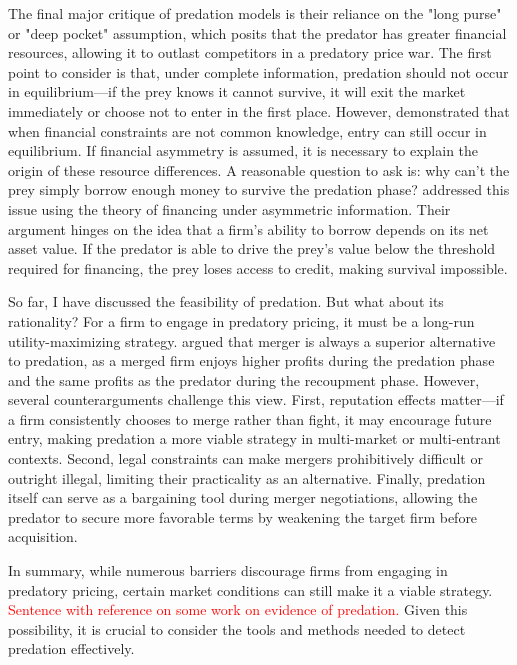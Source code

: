 \documentclass[12pt,oneside]{article}
\theoremstyle{definition}
\theoremstyle{remark}
\begin{document}
The final major critique of predation models is their reliance on the "long purse" or "deep pocket" assumption, which posits that the predator has greater financial resources, allowing it to outlast competitors in a predatory price war. The first point to consider is that, under complete information, predation should not occur in equilibrium—if the prey knows it cannot survive, it will exit the market immediately or choose not to enter in the first place. However, \cite{Benoit1984} demonstrated that when financial constraints are not common knowledge, entry can still occur in equilibrium. If financial asymmetry is assumed, it is necessary to explain the origin of these resource differences. A reasonable question to ask is: why can’t the prey simply borrow enough money to survive the predation phase? \citet{Fudenberg1985, Fudenberg1986} addressed this issue using the theory of financing under asymmetric information. Their argument hinges on the idea that a firm’s ability to borrow depends on its net asset value. If the predator is able to drive the prey’s value below the threshold required for financing, the prey loses access to credit, making survival impossible.

So far, I have discussed the feasibility of predation. But what about its rationality? For a firm to engage in predatory pricing, it must be a long-run utility-maximizing strategy. \cite{McGee1958} argued that merger is always a superior alternative to predation, as a merged firm enjoys higher profits during the predation phase and the same profits as the predator during the recoupment phase. However, several counterarguments challenge this view. First, reputation effects matter—if a firm consistently chooses to merge rather than fight, it may encourage future entry, making predation a more viable strategy in multi-market or multi-entrant contexts. Second, legal constraints can make mergers prohibitively difficult or outright illegal, limiting their practicality as an alternative. Finally, predation itself can serve as a bargaining tool during merger negotiations, allowing the predator to secure more favorable terms by weakening the target firm before acquisition.

In summary, while numerous barriers discourage firms from engaging in predatory pricing, certain market conditions can still make it a viable strategy. \textcolor{red}{Sentence with reference on some work on evidence of predation.} Given this possibility, it is crucial to consider the tools and methods needed to detect predation effectively.
\end{document}
